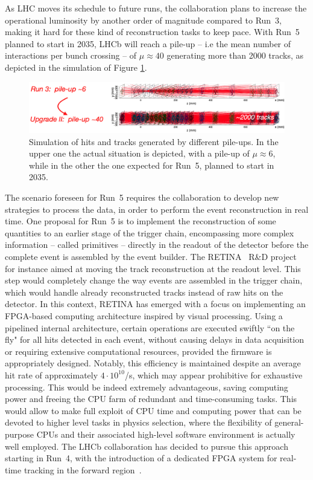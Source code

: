 As LHC moves its schedule to future runs, the collaboration plans to increase the operational luminosity by another order of magnitude compared to Run~3, making it hard for these kind of reconstruction tasks to keep pace. With Run~5 planned to start in 2035, LHCb will reach a pile-up -- i.e the mean number of interactions per bunch crossing -- of $\mu\approx 40$ generating more than 2000 tracks, as depicted in the simulation of Figure \ref{fig:velo_pile-up}. 

\begin{figure}
    \centering
    \includegraphics[width=\textwidth]{figures/VELO_pile-up.png}
    \caption{Simulation of hits and tracks generated by different pile-ups. In the upper one the actual situation is depicted, with a pile-up of $\mu\approx 6$, while in the other the one expected for Run~5, planned to start in 2035.}
    \label{fig:velo_pile-up}
\end{figure}

The scenario foreseen for Run~5 requires the collaboration to develop new strategies to process the data, in order to perform the event reconstruction in real time. One proposal for Run~5 is to implement the reconstruction of some quantities to an earlier stage of the trigger chain, encompassing  more complex information -- called primitives -- directly in the readout of the detector before the complete event is assembled by the event builder. The RETINA~\cite{refId0} R\&D project for instance aimed at moving the track reconstruction at the readout level. This step would completely change the way events are assembled in the trigger chain, which would handle already reconstructed tracks instead of raw hits on the detector. In this context, RETINA has emerged with a focus on implementing an FPGA-based computing architecture inspired by visual processing. Using a pipelined internal architecture, certain operations are executed swiftly ``on the fly" for all hits detected in each event, without causing delays in data acquisition or requiring extensive computational resources, provided the firmware is appropriately designed. Notably, this efficiency is maintained despite an average hit rate of approximately $4 \cdot 10^{10}$/s, which may appear prohibitive for exhaustive processing.
This would be indeed extremely advantageous, saving computing power and freeing the CPU farm of redundant and time-consuming tasks. This would allow to make full exploit of CPU time and computing power that can be devoted to higher level tasks in physics selection, where the flexibility of general-purpose CPUs and their associated high-level software environment is actually well employed. The LHCb collaboration has decided to pursue this approach starting in Run~4, with the introduction of a dedicated FPGA system for real-time tracking in the forward region~\cite{Morello:2888549}.

